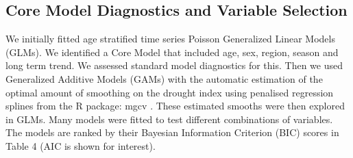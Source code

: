 \documentclass[a4paper]{article}                %
\begin{document}
\subsection{Core Model Diagnostics and Variable Selection}



        We initially fitted age stratified time series Poisson Generalized Linear Models (GLMs). We identified a Core Model that included age, sex, region, season and long term trend.  We assessed standard model diagnostics for this.
        Then we used Generalized Additive Models (GAMs) with the automatic estimation of the optimal amount of smoothing on the drought index using penalised regression splines from the R package: mgcv \cite{Wood2008}.  These estimated smooths were then explored in GLMs. Many models were fitted to test different combinations of variables.  The models are ranked by their Bayesian Information Criterion (BIC) scores in Table 4 (AIC is shown for interest).













\end{document}
